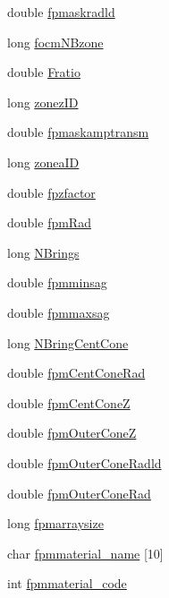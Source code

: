 \begin{DoxyCompactItemize}
double \hyperlink{structOPTPIAACMCDESIGN_ad6c571d51ab93c62406a1485713652c1}{fpmaskradld}
\item 
long \hyperlink{structOPTPIAACMCDESIGN_af885127a147736127de2d00f0872f7d3}{focm\+N\+Bzone}
\item 
double \hyperlink{structOPTPIAACMCDESIGN_a8395925e8cc76395b3f4efa8132c290c}{Fratio}
\item 
long \hyperlink{structOPTPIAACMCDESIGN_a46c2ef78ec06d39b947a793d0a03dc28}{zonez\+I\+D}
\item 
double \hyperlink{structOPTPIAACMCDESIGN_a263a0425fe40eda25832b7490b8b0391}{fpmaskamptransm}
\item 
long \hyperlink{structOPTPIAACMCDESIGN_afdfb76344ee9a82f3a5790fcb602ade6}{zonea\+I\+D}
\item 
double \hyperlink{structOPTPIAACMCDESIGN_a96c58c0598cb36779f027aaadb62073d}{fpzfactor}
\item 
double \hyperlink{structOPTPIAACMCDESIGN_aa1794c4a0929583574e315a064a1c538}{fpm\+Rad}
\item 
long \hyperlink{structOPTPIAACMCDESIGN_ac59ca64b62c48d2b6717d31114dcbf71}{N\+Brings}
\item 
double \hyperlink{structOPTPIAACMCDESIGN_abd8c35ecd940017543133dd855b1ffe3}{fpmminsag}
\item 
double \hyperlink{structOPTPIAACMCDESIGN_a5fd5d4ca057083ad662b5abac47d5140}{fpmmaxsag}
\item 
long \hyperlink{structOPTPIAACMCDESIGN_a501fee866e60cc90794c6d4fcfd3bc3a}{N\+Bring\+Cent\+Cone}
\item 
double \hyperlink{structOPTPIAACMCDESIGN_a493c4bf7d5a9348fb6331bb2f41adacb}{fpm\+Cent\+Cone\+Rad}
\item 
double \hyperlink{structOPTPIAACMCDESIGN_afc48f92c305dcd5b0ed1b3571eae68c8}{fpm\+Cent\+Cone\+Z}
\item 
double \hyperlink{structOPTPIAACMCDESIGN_a4951d69d7b5188a02510b3815812906e}{fpm\+Outer\+Cone\+Z}
\item 
double \hyperlink{structOPTPIAACMCDESIGN_a0feae8a5f179899a7cbd57e49e1c52df}{fpm\+Outer\+Cone\+Radld}
\item 
double \hyperlink{structOPTPIAACMCDESIGN_a640ea4b5690796066d3fc69aae0b157b}{fpm\+Outer\+Cone\+Rad}
\item 
long \hyperlink{structOPTPIAACMCDESIGN_a02a2edaa7c78edec5ec36133783318a9}{fpmarraysize}
\item 
char \hyperlink{structOPTPIAACMCDESIGN_a6db38f8bce4d5ac8817bbaa6e4630392}{fpmmaterial\+\_\+name} \mbox{[}10\mbox{]}
\item 
int \hyperlink{structOPTPIAACMCDESIGN_a109986baab6ae4c894500a5f2e350677}{fpmmaterial\+\_\+code}
\end{DoxyCompactItemize}


